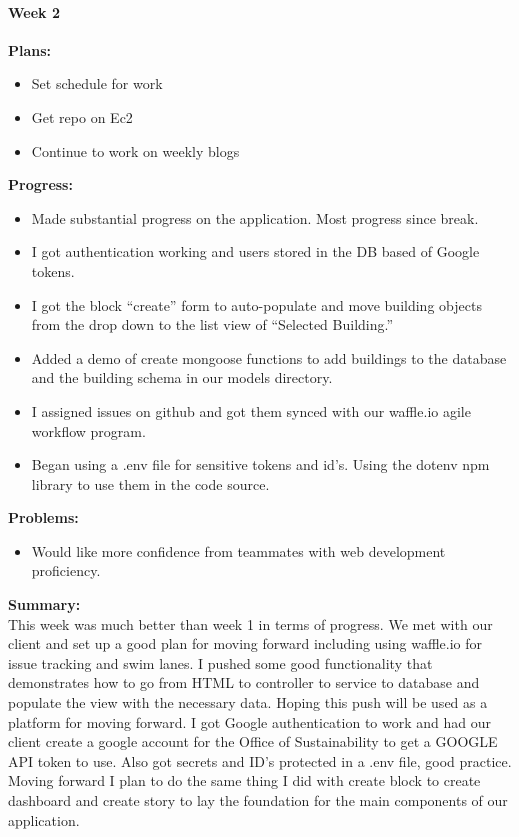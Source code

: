 \paragraph{Week 2}
\begin{adjustwidth}{2.5em}{0pt}
    \vspace{-0.5cm}\textbf{Plans:}
    \vspace{-0.5cm}
    \begin{itemize}
        \item Set schedule for work
        \item Get repo on Ec2
        \item Continue to work on weekly blogs 
    \end{itemize} 
    \vspace{-0.3cm}\textbf{Progress:}
    \vspace{-0.5cm}
    \begin{itemize}
        \item Made substantial progress on the application. Most progress since break. 
        \item I got authentication working and users stored in the DB based of Google tokens. 
        \item I got the block ``create'' form to auto-populate and move building objects from the drop down to the list view of ``Selected Building.''
        \item Added a demo of create mongoose functions to add buildings to the database and the building schema in our models directory. 
        \item I assigned issues on github and got them synced with our waffle.io agile workflow program.
        \item Began using a .env file for sensitive tokens and id's. Using the dotenv npm library to use them in the code source.
    \end{itemize} 
    \vspace{-0.3cm}\textbf{Problems:}
    \vspace{-0.5cm}
    \begin{itemize}
        \item Would like more confidence from teammates with web development proficiency.
    \end{itemize}  
    \vspace{-0.3cm}\noindent\textbf{Summary:}\\
    \noindent This week was much better than week 1 in terms of progress. We met with our client and set up a good plan for moving forward including using waffle.io for issue tracking and swim lanes. I pushed some good functionality that demonstrates how to go from HTML to controller to service to database and populate the view with the necessary data. Hoping this push will be used as a platform for moving forward. I got Google authentication to work and had our client create a google account for the Office of Sustainability to get a GOOGLE API token to use. Also got secrets and ID's protected in a .env file, good practice. Moving forward I plan to do the same thing I did with create block to create dashboard and create story to lay the foundation for the main components of our application. 
\end{adjustwidth} 
